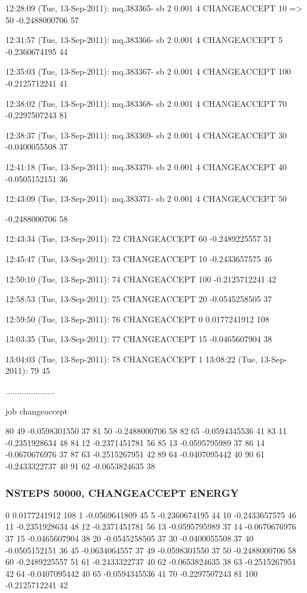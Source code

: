 12:28:09 (Tue, 13-Sep-2011):
	mq.383365- sb 2 0.001 4
							CHANGEACCEPT 10 => 50
-0.2488000706 57 

12:31:57 (Tue, 13-Sep-2011):
	mq.383366- sb 2 0.001 4
							CHANGEACCEPT 5
-0.2360674195 44 

12:35:03 (Tue, 13-Sep-2011):
	mq.383367- sb 2 0.001 4
							CHANGEACCEPT 100
-0.2125712241 41 

12:38:02 (Tue, 13-Sep-2011):
	mq.383368- sb 2 0.001 4
							CHANGEACCEPT 70
-0.2297507243 81 

12:38:37 (Tue, 13-Sep-2011):
	mq.383369- sb 2 0.001 4
							CHANGEACCEPT 30
-0.0400055508 37 

12:41:18 (Tue, 13-Sep-2011):
	mq.383370- sb 2 0.001 4
							CHANGEACCEPT 40
-0.0505152151 36

12:43:09 (Tue, 13-Sep-2011):
	mq.383371- sb 2 0.001 4
							CHANGEACCEPT 50

-0.2488000706 58 

12:43:34 (Tue, 13-Sep-2011):
		72 
							CHANGEACCEPT 60
-0.2489225557 51 

12:45:47 (Tue, 13-Sep-2011):
		73
							CHANGEACCEPT 10
-0.2433657575 46 

12:50:10 (Tue, 13-Sep-2011):
		74
							CHANGEACCEPT 100
-0.2125712241 42 

12:58:53 (Tue, 13-Sep-2011):
		75
							CHANGEACCEPT 20
-0.0545258505 37 

12:59:50 (Tue, 13-Sep-2011):
		76
							CHANGEACCEPT 0 
0.0177241912 108 

13:03:35 (Tue, 13-Sep-2011):
		77
							CHANGEACCEPT 15
-0.0465607904 38 

13:04:03 (Tue, 13-Sep-2011):
		78
							CHANGEACCEPT 1
13:08:22 (Tue, 13-Sep-2011):
		79 45

.....................

job changeaccept

		80 49 -0.0598301550 37 
		81 50 -0.2488000706 58 
		82 65 -0.0594345536 41  
		83 11 -0.2351928634 48 
		84 12 -0.2371451781 56 
		85 13 -0.0595795989 37 
		86 14 -0.0670676976 37
		87 63 -0.2515267951 42 
		89 64 -0.0407095442 40 
		90 61 -0.2433322737 40 
		91 62 -0.0653824635 38 


\subsubsection{NSTEPS 50000, CHANGEACCEPT ENERGY}

0 0.0177241912 108 
1 -0.0569641809 45 
5 -0.2360674195 44
10 -0.2433657575 46
11 -0.2351928634 48
12 -0.2371451781 56 
13 -0.0595795989 37 
14 -0.0670676976 37 
15 -0.0465607904 38
20 -0.0545258505 37
30 -0.0400055508 37
40 -0.0505152151 36 
45 -0.0634064557 37 
49 -0.0598301550 37
50 -0.2488000706 58
60 -0.2489225557 51
61 -0.2433322737 40 
62 -0.0653824635 38
63 -0.2515267951 42 
64 -0.0407095442 40 
65 -0.0594345536 41 
70 -0.2297507243 81
100 -0.2125712241 42 

